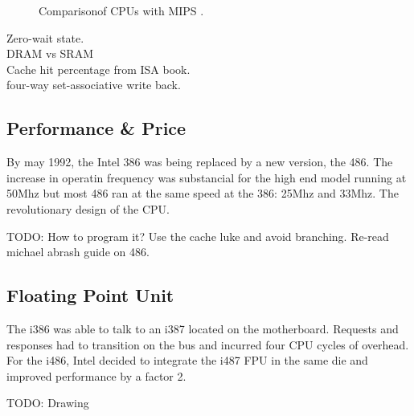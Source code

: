 \begin{figure}[H]
\centering
   \caption{Comparison\protect\footnotemark of CPUs with MIPS \protect\footnotemark.}
 \end{figure}

Zero-wait state.\\
DRAM vs SRAM\\
Cache hit percentage from ISA book.\\
four-way set-associative write back.\\



\subsection{Performance \& Price}
By may 1992, the Intel 386 was being replaced by a new version, the 486. The increase in operatin frequency was substancial for the high end model running at 50Mhz but most 486 ran at the same speed at the 386: 25Mhz and 33Mhz. The revolutionary design of the CPU.\\
\par
TODO: How to program it? Use the cache luke and avoid branching. Re-read michael abrash guide on 486.
\subsection{Floating Point Unit}
The i386 was able to talk to an i387 located on the motherboard. Requests and responses had to transition on the bus and incurred four CPU cycles of overhead. For the i486, Intel decided to integrate the i487 FPU in the same die and improved performance by a factor 2.\\
\par
TODO: Drawing
\par

